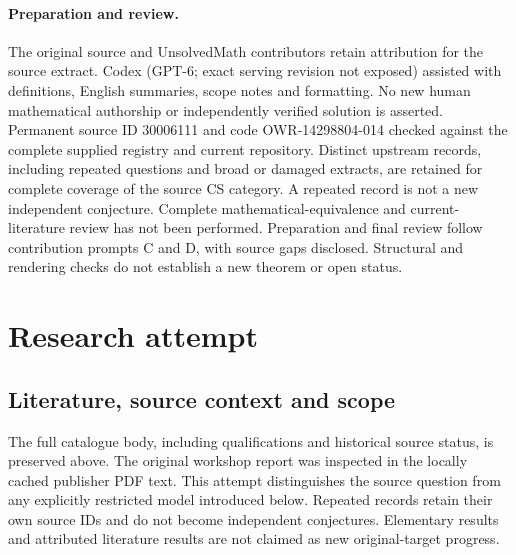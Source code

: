 \documentclass[11pt]{article}
\begin{document}
\paragraph{Preparation and review.}
The original source and UnsolvedMath contributors retain attribution for the source extract. Codex (GPT-6; exact serving revision not exposed) assisted with definitions, English summaries, scope notes and formatting. No new human mathematical authorship or independently verified solution is asserted. Permanent source ID 30006111 and code OWR-14298804-014 checked against the complete supplied registry and current repository. Distinct upstream records, including repeated questions and broad or damaged extracts, are retained for complete coverage of the source CS category. A repeated record is not a new independent conjecture. Complete mathematical-equivalence and current-literature review has not been performed. Preparation and final review follow contribution prompts C and D, with source gaps disclosed. Structural and rendering checks do not establish a new theorem or open status.
\label{end:30006111}

\section{Research attempt}
\subsection{Literature, source context and scope}
The full catalogue body, including qualifications and historical source status, is preserved above. The original workshop report was inspected in the locally cached publisher PDF text. This attempt distinguishes the source question from any explicitly restricted model introduced below. Repeated records retain their own source IDs and do not become independent conjectures. Elementary results and attributed literature results are not claimed as new original-target progress.
\end{document}
